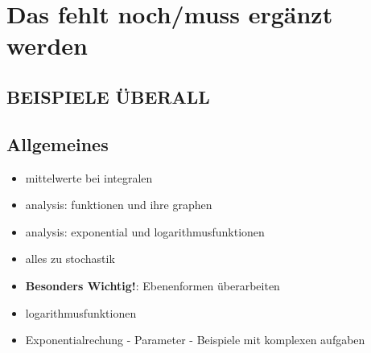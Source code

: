 \chapter{Das fehlt noch/muss ergänzt werden}
\section{BEISPIELE ÜBERALL}
\section{Allgemeines}
\begin{itemize}
    \item mittelwerte bei integralen
    \item analysis: funktionen und ihre graphen
    \item analysis: exponential und logarithmusfunktionen
    \item alles zu stochastik
    \item \textbf{Besonders Wichtig!}: Ebenenformen überarbeiten 
    \item logarithmusfunktionen
    \item Exponentialrechung - Parameter - Beispiele mit komplexen aufgaben
\end{itemize}

